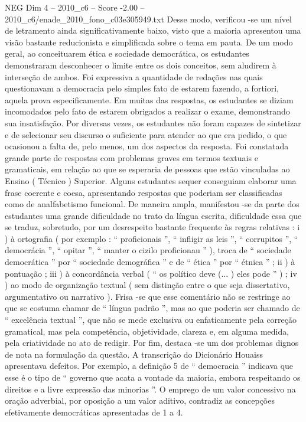 \begin{textsample}{NEG Dim 4 – 2010\_c6 – Score -2.00 – 2010\_c6/enade\_2010\_fono\_c03e305949.txt}
Desse modo, verificou -se um nível de letramento ainda significativamente baixo, visto que a maioria apresentou uma visão bastante reducionista e simplificada sobre o tema em pauta.
De um modo geral, ao conceituarem ética e sociedade democrática, os estudantes demonstraram desconhecer o limite entre os dois conceitos, sem aludirem à interseção de ambos.
Foi expressiva a quantidade de redações nas quais questionavam a democracia pelo simples fato de estarem fazendo, a fortiori, aquela prova especificamente.
Em muitas das respostas, os estudantes se diziam incomodados pelo fato de estarem obrigados a realizar o exame, demonstrando sua insatisfação.
Por diversas vezes, os estudantes não foram capazes de sintetizar e de selecionar seu discurso o suficiente para atender ao que era pedido, o que ocasionou a falta de, pelo menos, um dos aspectos da resposta.
Foi constatada grande parte de respostas com problemas graves em termos textuais e gramaticais, em relação ao que se esperaria de pessoas que estão vinculadas ao Ensino ( Técnico ) Superior.
Alguns estudantes sequer conseguiam elaborar uma frase coerente e coesa, apresentando respostas que poderiam ser classificadas como de analfabetismo funcional.
De maneira ampla, manifestou -se da parte dos estudantes uma grande dificuldade no trato da língua escrita, dificuldade essa que se traduz, sobretudo, por um desrespeito bastante frequente às regras relativas : i ) à ortografia ( por exemplo : “ proficionais ”, “ infligir as leis ”, “ corrupitos ”, “ democrácia ”, “ opitar ”, “ manter o cizilo proficionau ” ), troca de “ sociedade democrática ” por “ sociedade demográfica ” e de “ ética ” por “ étnica ” ; ii ) à pontuação ; iii ) à concordância verbal ( “ os político deve (... ) eles pode ” ) ; iv ) ao modo de organização textual ( sem distinção entre o que seja dissertativo, argumentativo ou narrativo ).
Frisa -se que esse comentário não se restringe ao que se costuma chamar de “ língua padrão ”, mas ao que poderia ser chamado de “ excelência textual ”, que não se mede exclusiva ou enfaticamente pela correção gramatical, mas pela competência, objetividade, clareza e, em alguma medida, pela criatividade no ato de redigir.
Por fim, destaca -se um dos problemas dignos de nota na formulação da questão.
A transcrição do Dicionário Houaiss apresentava defeitos.
Por exemplo, a definição 5 de “ democracia ” indicava que esse é o tipo de “ governo que acata a vontade da maioria, embora respeitando os direitos e a livre expressão das minorias ”.
O emprego de um valor concessivo na oração adverbial, por oposição a um valor aditivo, contradiz as concepções efetivamente democráticas apresentadas de 1 a 4.

\end{textsample}
